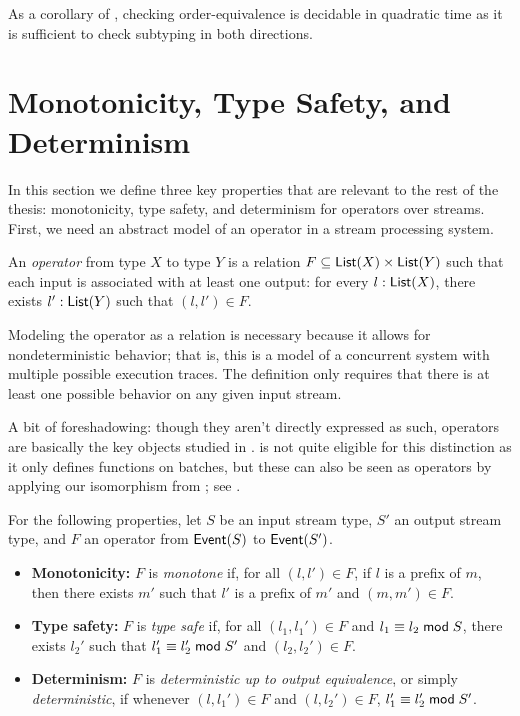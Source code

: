 As a corollary of , checking order-equivalence is decidable in quadratic time as it is sufficient to check subtyping in both directions.

\section{Monotonicity, Type Safety, and Determinism}
\label{sec:operator-properties}

In this section we define three key properties that are relevant to the rest of the thesis: monotonicity, type safety, and determinism for operators over streams.
First, we need an abstract model of an operator in a stream processing system.
\begin{definition}
\label{def:operator}
An \emph{operator} from type $X$ to type $Y$ is a relation
$F \subseteq \mathsf{List}(X) \times \mathsf{List}(Y)$ such that each input is associated with at least one output:
for every $l: \mathsf{List}(X)$, there exists $l': \mathsf{List}(Y)$
such that $(l, l') \in F$.
\end{definition}

Modeling the operator as a relation is necessary because it allows for nondeterministic behavior; that is, this is a model of a concurrent system with multiple possible execution traces. The definition only requires that there is at least one possible behavior on any given input stream.

A bit of foreshadowing: though they aren't directly expressed as such, operators are basically the key objects studied in .
 is not quite eligible for this distinction as it only defines functions on batches, but these can also be seen as operators by applying our isomorphism from ; see .

For the following properties, let $S$ be an input stream type, $S'$ an output stream type, and $F$ an operator from $\mathsf{Event}(S)$ to $\mathsf{Event}(S')$.
\begin{itemize}
  \item \textbf{Monotonicity:} $F$ is \emph{monotone}
  if, for all $(l, l') \in F$, if $l$ is a prefix of $m$, then there
  exists $m'$ such that $l'$ is a prefix of $m'$ and $(m, m') \in F$.

  \item \textbf{Type safety:} $F$ is \emph{type safe} if, for all $(l_1, l_1') \in F$ and $l_1 \equiv l_2 \;\mathsf{mod}\; {S}$, there exists $l_2'$ such that $l_1' \equiv l_2' \;\mathsf{mod}\; {S'}$ and $(l_2, l_2') \in F$.

  \item \textbf{Determinism:} $F$ is \emph{deterministic up to output equivalence}, or simply \emph{deterministic}, if whenever $(l, l_1') \in F$ and $(l, l_2') \in F$, $l_1' \equiv l_2' \;\mathsf{mod}\; {S'}$.
\end{itemize}


